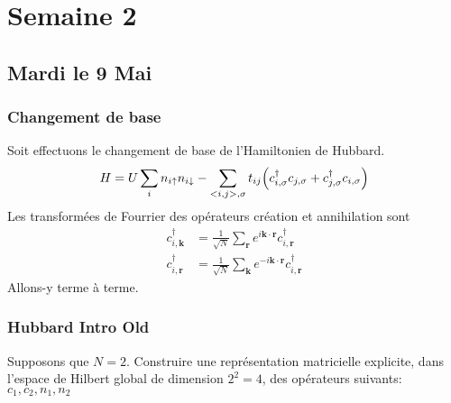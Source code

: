 \documentclass{subfiles}[../main.tex]
\begin{document}
    \section{Semaine 2} %
    \label{sec:Semaine 2}
        \subsection{Mardi le 9 Mai} %
        \label{sub:Mardi le 9 Mai}

            \subsubsection{Changement de base} %
            \label{sec:Changement de base}
            Soit effectuons le changement de base de l'Hamiltonien de Hubbard.
            \begin{align}
                H=U\sum_{i}n_{i\uparrow}n_{i\downarrow}
                -\sum_{<i,j>,\sigma}t_{ij}\qty(
                    c^\dagger_{i,\sigma}c_{j,\sigma}
                    +
                    c^\dagger_{j,\sigma}c_{i,\sigma}
                )
            \end{align}
            Les transformées de Fourrier des opérateurs création et
            annihilation sont
            \begin{align}
                c^\dagger_{i,\bm{k}}&=\frac{1}{\sqrt{N}}\sum_{\bm{r}}
                e^{i\bm{k}\cdot\bm{r}}
                c^\dagger_{i,\bm{r}}\\
                c^\dagger_{i,\bm{r}}&=\frac{1}{\sqrt{N}}\sum_{\bm{k}}
                e^{-i\bm{k}\cdot\bm{r}}
                c^\dagger_{i,\bm{r}}
            \end{align}
            Allons-y terme à terme.

            \subsubsection{Hubbard Intro Old} %
            \label{sec:Hubbard Intro Old}
            \begin{problem}
                Supposons que $N=2$.
            Construire une représentation matricielle
            explicite, dans l'espace de Hilbert global
            de dimension $2^2=4$, des opérateurs suivants:
            $c_1,c_2,n_1,n_2$
            \end{problem}
\end{document}
